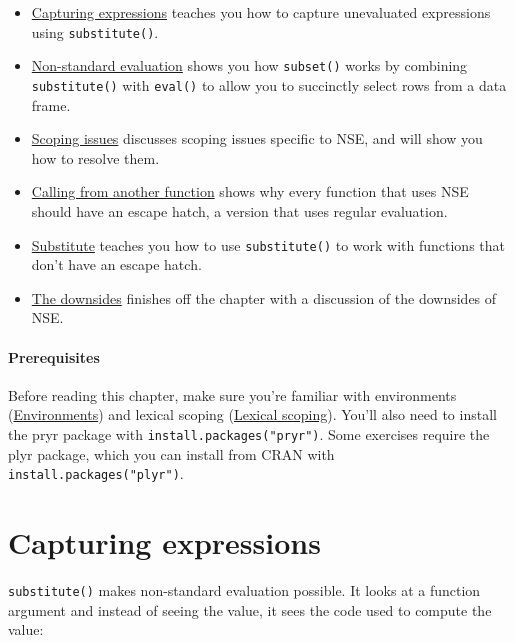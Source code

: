 \begin{itemize}
\item
  \protect\hyperlink{capturing-expressions}{Capturing expressions}
  teaches you how to capture unevaluated expressions using
  \texttt{substitute()}.
\item
  \protect\hyperlink{subset}{Non-standard evaluation} shows you how
  \texttt{subset()} works by combining \texttt{substitute()} with
  \texttt{eval()} to allow you to succinctly select rows from a data
  frame.
\item
  \protect\hyperlink{scoping-issues}{Scoping issues} discusses scoping
  issues specific to NSE, and will show you how to resolve them.
\item
  \protect\hyperlink{calling-from-another-function}{Calling from another
  function} shows why every function that uses NSE should have an escape
  hatch, a version that uses regular evaluation.
\item
  \protect\hyperlink{substitute}{Substitute} teaches you how to use
  \texttt{substitute()} to work with functions that don't have an escape
  hatch.
\item
  \protect\hyperlink{nse-downsides}{The downsides} finishes off the
  chapter with a discussion of the downsides of NSE.
\end{itemize}

\hypertarget{prerequisites}{%
\paragraph{Prerequisites}\label{prerequisites}}

Before reading this chapter, make sure you're familiar with environments
(\protect\hyperlink{environments}{Environments}) and lexical scoping
(\protect\hyperlink{lexical-scoping}{Lexical scoping}). You'll also need
to install the pryr package with \texttt{install.packages("pryr")}. Some
exercises require the plyr package, which you can install from CRAN with
\texttt{install.packages("plyr")}.

\hypertarget{capturing-expressions}{%
\section{Capturing expressions}\label{capturing-expressions}}

\texttt{substitute()} makes non-standard evaluation possible. It looks
at a function argument and instead of seeing the value, it sees the code
used to compute the value: 

